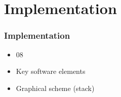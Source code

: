 \section{Implementation}

\begin{frame}%
\frametitle{Implementation}

\begin{itemize}
  \item 08
  \item Key software elements
  \item Graphical scheme (stack)
\end{itemize}

\end{frame}